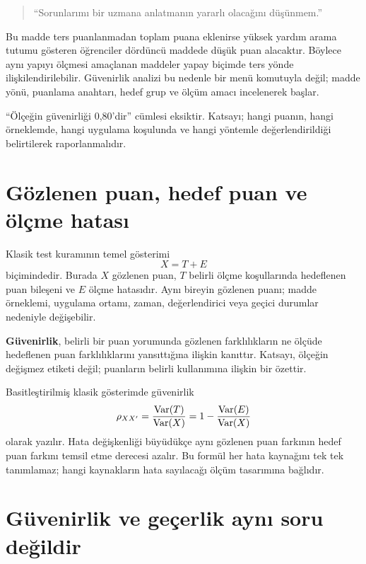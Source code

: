 \begin{quote}
``Sorunlarımı bir uzmana anlatmanın yararlı olacağını düşünmem.''
\end{quote}

Bu madde ters puanlanmadan toplam puana eklenirse yüksek yardım arama tutumu
gösteren öğrenciler dördüncü maddede düşük puan alacaktır. Böylece aynı yapıyı
ölçmesi amaçlanan maddeler yapay biçimde ters yönde ilişkilendirilebilir.
Güvenirlik analizi bu nedenle bir menü komutuyla değil; madde yönü, puanlama
anahtarı, hedef grup ve ölçüm amacı incelenerek başlar.

\begin{researchbox}
``Ölçeğin güvenirliği 0,80'dir'' cümlesi eksiktir. Katsayı; hangi puanın,
hangi örneklemde, hangi uygulama koşulunda ve hangi yöntemle değerlendirildiği
belirtilerek raporlanmalıdır.
\end{researchbox}

\section{Gözlenen puan, hedef puan ve ölçme hatası}

Klasik test kuramının temel gösterimi
\[
X=T+E
\]
biçimindedir. Burada $X$ gözlenen puan, $T$ belirli ölçme koşullarında hedeflenen
puan bileşeni ve $E$ ölçme hatasıdır. Aynı bireyin gözlenen puanı; madde
örneklemi, uygulama ortamı, zaman, değerlendirici veya geçici durumlar nedeniyle
değişebilir.

\begin{definitionbox}
\textbf{Güvenirlik}, belirli bir puan yorumunda gözlenen farklılıkların ne
ölçüde hedeflenen puan farklılıklarını yansıttığına ilişkin kanıttır. Katsayı,
ölçeğin değişmez etiketi değil; puanların belirli kullanımına ilişkin bir
özettir.
\end{definitionbox}

Basitleştirilmiş klasik gösterimde güvenirlik
\[
\rho_{XX'}=\frac{\operatorname{Var}(T)}{\operatorname{Var}(X)}
=1-\frac{\operatorname{Var}(E)}{\operatorname{Var}(X)}
\]
olarak yazılır. Hata değişkenliği büyüdükçe aynı gözlenen puan farkının hedef
puan farkını temsil etme derecesi azalır. Bu formül her hata kaynağını tek tek
tanımlamaz; hangi kaynakların hata sayılacağı ölçüm tasarımına bağlıdır.

\section{Güvenirlik ve geçerlik aynı soru değildir}

